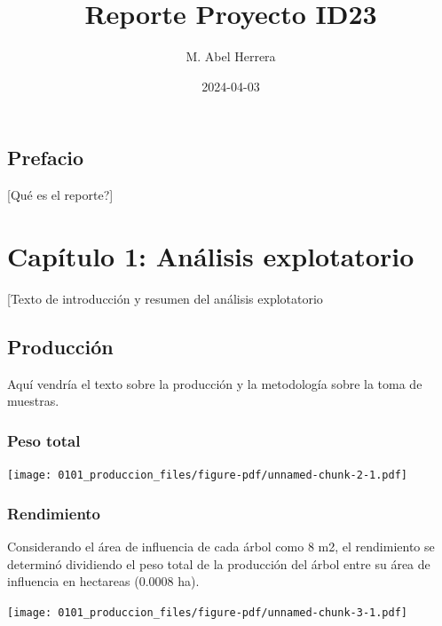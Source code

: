 \documentclass[
  letterpaper,
  DIV=11,
  numbers=noendperiod]{scrreprt}
\title{Reporte Proyecto ID23\textbar10297}
\author{M. Abel Herrera}
\date{2024-04-03}
\renewcommand*\contentsname{Tabla de contenidos}
\newcommand\contentsname{Tabla de contenidos}
\begin{document}
\maketitle

\renewcommand*\contentsname{Tabla de contenidos}
{
\hypersetup{linkcolor=}
\setcounter{tocdepth}{2}
\tableofcontents
}

\chapter*{Prefacio}\label{prefacio}


{[}Qué es el reporte?{]}

\part{Capítulo 1: Análisis explotatorio}

{[}Texto de introducción y resumen del análisis explotatorio

\chapter{Producción}\label{producciuxf3n}

Aquí vendría el texto sobre la producción y la metodología sobre la toma
de muestras.

\section{Peso total}\label{peso-total}

\begin{center}
\texttt{[image: 0101\_produccion\_files/figure-pdf/unnamed-chunk-2-1.pdf]}
\end{center}

\section{Rendimiento}\label{rendimiento}

Considerando el área de influencia de cada árbol como 8 m2, el
rendimiento se determinó dividiendo el peso total de la producción del
árbol entre su área de influencia en hectareas (0.0008 ha).

\begin{center}
\texttt{[image: 0101\_produccion\_files/figure-pdf/unnamed-chunk-3-1.pdf]}
\end{center}
\end{document}

